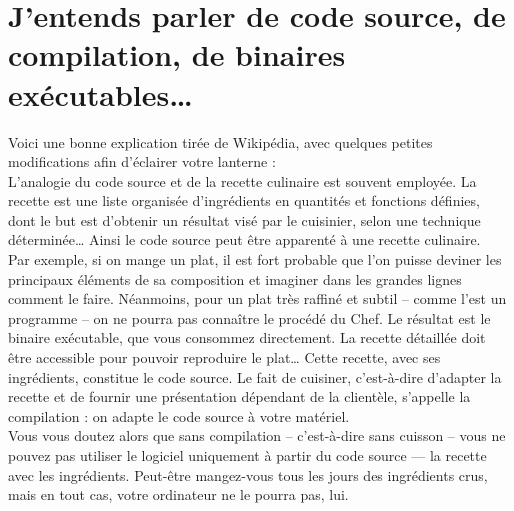 \section{J'entends parler de code source, de compilation, de binaires exécutables\ldots{}}
\label{RefSourceBinaire}
Voici une bonne explication tirée de Wikipédia, avec quelques petites modifications afin d'éclairer votre lanterne :\\
L'analogie du code source et de la recette culinaire est souvent employée. La recette est une liste organisée d'ingrédients en quantités et fonctions définies, dont le but est d'obtenir un résultat visé par le cuisinier, selon une technique déterminée\ldots{} Ainsi le code source peut être apparenté à une recette culinaire.\\
Par exemple, si on mange un plat, il est fort probable que l'on puisse deviner les principaux éléments de sa composition et imaginer dans les grandes lignes comment le faire. Néanmoins, pour un plat très raffiné et subtil -- comme l'est un programme -- on ne pourra pas connaître le procédé du Chef. Le résultat est le binaire exécutable, que vous consommez directement. La recette détaillée doit être accessible pour pouvoir reproduire le plat\ldots{} Cette recette, avec ses ingrédients, constitue le code source. Le fait de cuisiner, c'est-à-dire d'adapter la recette et de fournir une présentation dépendant de la clientèle, s'appelle la compilation : on adapte le code source à votre matériel.\\ 
Vous vous doutez alors que sans compilation -- c'est-à-dire sans cuisson -- vous ne pouvez pas utiliser le logiciel uniquement à partir du code source --- la recette avec les ingrédients. Peut-être mangez-vous tous les jours des ingrédients crus, mais en tout cas, votre ordinateur ne le pourra pas, lui.
